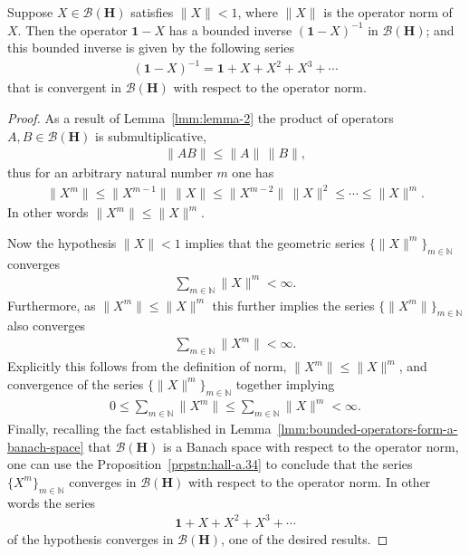 \begin{lemma}
    \label{lmm:hall-7.6}
    \leanok
    Suppose $X \in \mathcal{B}(\mathbf{H})$ satisfies $\|X\| < 1$, where $\|X\|$ is the operator norm of $X$. Then the operator $\mathbf{1} - X$ has a bounded inverse $(\mathbf{1} - X)^{-1}$ in $\mathcal{B}(\mathbf{H})$; and this bounded inverse is given by the following series
    \begin{align}
        (\mathbf{1} - X)^{-1} = \mathbf{1} + X + X^2 + X^3 + \cdots
    \end{align}
    that is convergent in $\mathcal{B}(\mathbf{H})$ with respect to the operator norm.
\end{lemma}
\begin{proof}
    \leanok
As a result of Lemma~\ref{lmm:lemma-2} the product of operators $A,B \in \mathcal{B}(\mathbf{H})$ is submultiplicative,
\begin{align}
    \|AB\| \le \|A\| \, \|B\|,
\end{align}
thus for an arbitrary natural number $m$ one has
\begin{align}
    \|X^m\| \le \|X^{m - 1}\| \, \|X\| \le \|X^{m-2}\| \, \|X\|^2 \le \cdots \le \|X\|^m.
\end{align}
In other words $\|X^m\| \le \|X\|^m$.

Now the hypothesis $\|X\| < 1$ implies that the geometric series $\{\|X\|^m\}_{m \in \mathbb{N}}$ converges
\begin{align}
    \sum\limits_{m \in \mathbb{N}} \|X\|^m < \infty.
\end{align}
Furthermore, as $\|X^m\| \le \|X\|^m$ this further implies the series $\{\|X^m\|\}_{m \in \mathbb{N}}$ also converges
\begin{align}
    \sum\limits_{m \in \mathbb{N}} \|X^m\| < \infty.
\end{align}
Explicitly this follows from the definition of norm, $\|X^m\| \le \|X\|^m$, and convergence of the series $\{\|X\|^m\}_{m \in \mathbb{N}}$ together implying
\begin{align}
    0 \le \sum\limits_{m \in \mathbb{N}} \|X^m\| \le \sum\limits_{m \in \mathbb{N}} \|X\|^m < \infty.
\end{align}
Finally, recalling the fact established in Lemma~\ref{lmm:bounded-operators-form-a-banach-space} that $\mathcal{B}(\mathbf{H})$ is a Banach space with respect to the operator norm, one can use the Proposition~\ref{prpstn:hall-a.34} to conclude that the series $\{X^m\}_{m \in \mathbb{N}}$ converges in $\mathcal{B}(\mathbf{H})$ with respect to the operator norm. In other words the series
\begin{align}
    \mathbf{1} + X + X^2 + X^3 + \cdots
\end{align}
of the hypothesis converges in $\mathcal{B}(\mathbf{H})$, one of the desired results.


\end{proof}

